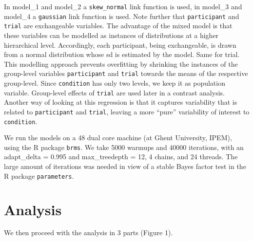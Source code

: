 \documentclass[
]{article}
\begin{document}
In model\_1 and model\_2 a \texttt{skew\_normal} link function is used,
in model\_3 and model\_4 a \texttt{gaussian} link function is used. Note
further that \texttt{participant} and \texttt{trial} are exchangeable
variables. The advantage of the mixed model is that these variables can
be modelled as instances of distributions at a higher hierarchical
level. Accordingly, each participant, being exchangeable, is drawn from
a normal distribution whose sd is estimated by the model. Same for
trial. This modelling approach prevents overfitting by shrinking the
instances of the group-level variables \texttt{participant} and
\texttt{trial} towards the means of the respective group-level. Since
\texttt{condition} has only two levels, we keep it as population
variable. Group-level effects of \texttt{trial} are used later in a
contrast analysis. Another way of looking at this regression is that it
captures variability that is related to \texttt{participant} and
\texttt{trial}, leaving a more ``pure'' variability of interest to
\texttt{condition}.

We run the models on a 48 dual core machine (at Ghent University, IPEM),
using the R package \texttt{brms}. We take 5000 warmups and 40000
iterations, with an adapt\_delta = 0.995 and max\_treedepth = 12, 4
chains, and 24 threads. The large amount of iterations was needed in
view of a stable Bayes factor test in the R package \texttt{parameters}.

\hypertarget{analysis}{%
\section{Analysis}\label{analysis}}

We then proceed with the analysis in 3 parts (Figure 1).
\end{document}
